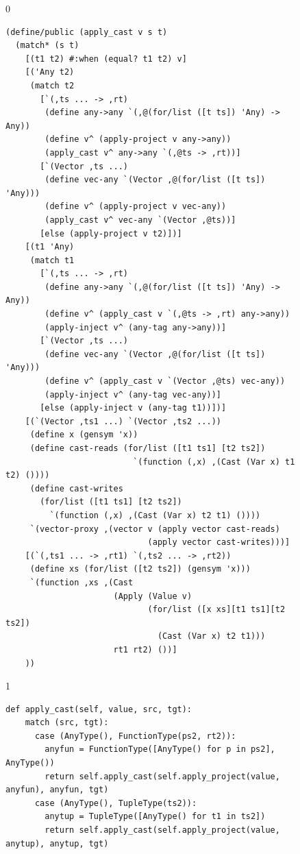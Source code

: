 \documentclass[7x10]{TimesAPriori_MIT}%
\def\racketEd{0}
\def\pythonEd{1}
\def\edition{0}
\numberwithin{theorem}{chapter}
\numberwithin{definition}{chapter}
\numberwithin{equation}{chapter}
\begin{document}
\begin{figure}[tbp]
  \begin{tcolorbox}[colback=white]
{\if\edition\racketEd    
\begin{lstlisting}[basicstyle=\ttfamily\footnotesize]
(define/public (apply_cast v s t)
  (match* (s t)
    [(t1 t2) #:when (equal? t1 t2) v]
    [('Any t2) 
     (match t2
       [`(,ts ... -> ,rt)
        (define any->any `(,@(for/list ([t ts]) 'Any) -> Any))
        (define v^ (apply-project v any->any))
        (apply_cast v^ any->any `(,@ts -> ,rt))]
       [`(Vector ,ts ...)
        (define vec-any `(Vector ,@(for/list ([t ts]) 'Any)))
        (define v^ (apply-project v vec-any))
        (apply_cast v^ vec-any `(Vector ,@ts))]
       [else (apply-project v t2)])]
    [(t1 'Any) 
     (match t1
       [`(,ts ... -> ,rt)
        (define any->any `(,@(for/list ([t ts]) 'Any) -> Any))
        (define v^ (apply_cast v `(,@ts -> ,rt) any->any))
        (apply-inject v^ (any-tag any->any))]
       [`(Vector ,ts ...)
        (define vec-any `(Vector ,@(for/list ([t ts]) 'Any)))
        (define v^ (apply_cast v `(Vector ,@ts) vec-any))
        (apply-inject v^ (any-tag vec-any))]
       [else (apply-inject v (any-tag t1))])]
    [(`(Vector ,ts1 ...) `(Vector ,ts2 ...))
     (define x (gensym 'x))
     (define cast-reads (for/list ([t1 ts1] [t2 ts2])
                          `(function (,x) ,(Cast (Var x) t1 t2) ())))
     (define cast-writes
       (for/list ([t1 ts1] [t2 ts2])
         `(function (,x) ,(Cast (Var x) t2 t1) ())))
     `(vector-proxy ,(vector v (apply vector cast-reads)
                             (apply vector cast-writes)))]
    [(`(,ts1 ... -> ,rt1) `(,ts2 ... -> ,rt2))
     (define xs (for/list ([t2 ts2]) (gensym 'x)))
     `(function ,xs ,(Cast
                      (Apply (Value v)
                             (for/list ([x xs][t1 ts1][t2 ts2])
                               (Cast (Var x) t2 t1)))
                      rt1 rt2) ())]
    ))
\end{lstlisting}
\fi}
{\if\edition\pythonEd
\begin{lstlisting}[basicstyle=\ttfamily\footnotesize]
  def apply_cast(self, value, src, tgt):
    match (src, tgt):
      case (AnyType(), FunctionType(ps2, rt2)):
        anyfun = FunctionType([AnyType() for p in ps2], AnyType())
        return self.apply_cast(self.apply_project(value, anyfun), anyfun, tgt)
      case (AnyType(), TupleType(ts2)):
        anytup = TupleType([AnyType() for t1 in ts2])
        return self.apply_cast(self.apply_project(value, anytup), anytup, tgt)

\end{lstlisting}}
\end{tcolorbox}
\end{figure}
\end{document}
